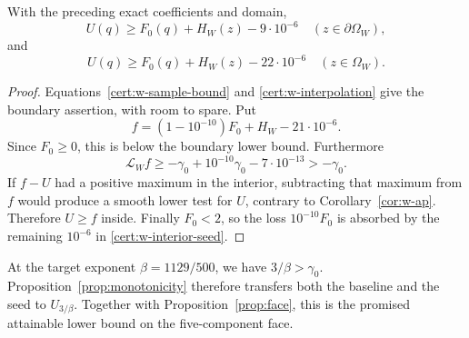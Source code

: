 \begin{proposition}
\label{cert:w-seed}
With the preceding exact coefficients and domain,
\[
 U(q)\ge F_0(q)+H_W(z)-9\cdot10^{-6}\quad (z\in\partial\Omega_W),
\]
and
\begin{equation}
 U(q)\ge F_0(q)+H_W(z)-22\cdot10^{-6}\quad (z\in\Omega_W).
 \label{cert:w-interior-seed}
\end{equation}
\end{proposition}
\begin{proof}
Equations~\eqref{cert:w-sample-bound} and
\eqref{cert:w-interpolation} give the boundary assertion, with room
to spare.  Put
\[
 f=(1-10^{-10})F_0+H_W-21\cdot10^{-6}.
\]
Since $F_0\ge0$, this is below the boundary lower bound.  Furthermore
\[
 \mathcal L_W f\ge-\gamma _0+10^{-10}\gamma _0-7\cdot10^{-13}
                      >-\gamma _0.
\]
If $f-U$ had a positive maximum in the interior, subtracting that
maximum from $f$ would produce a smooth lower test for $U$, contrary
to Corollary~\ref{cor:w-ap}.  Therefore $U\ge f$ inside.  Finally
$F_0<2$, so the loss $10^{-10}F_0$ is absorbed by the remaining
$10^{-6}$ in \eqref{cert:w-interior-seed}.
\end{proof}

At the target exponent $\beta=1129/500$, we have
$3/\beta>\gamma _0$.  Proposition~\ref{prop:monotonicity} therefore
transfers both the baseline and the seed to $U_{3/\beta}$.
Together with Proposition~\ref{prop:face}, this is the promised
attainable lower bound on the five-component face.
